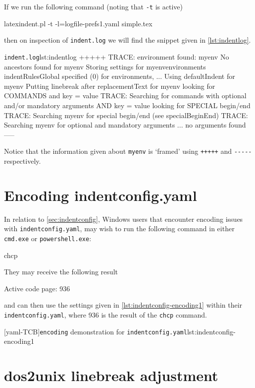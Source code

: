   If we run the following command (noting that \texttt{-t} is active)
  \begin{commandshell}
latexindent.pl -t -l=logfile-prefs1.yaml simple.tex 
\end{commandshell}
  then on inspection of \texttt{indent.log} we will find the snippet given in
  \cref{lst:indentlog}.
  \begin{cmhlistings}[style=tcblatex,morekeywords={TRACE}]{\texttt{indent.log}}{lst:indentlog}
       +++++
TRACE: environment found: myenv
       No ancestors found for myenv
       Storing settings for myenvenvironments
       indentRulesGlobal specified (0) for environments, ...
       Using defaultIndent for myenv
       Putting linebreak after replacementText for myenv
       looking for COMMANDS and key = {value}
TRACE: Searching for commands with optional and/or mandatory arguments AND key = {value}
       looking for SPECIAL begin/end
TRACE: Searching myenv for special begin/end (see specialBeginEnd)
TRACE: Searching myenv for optional and mandatory arguments
       ... no arguments found
       -----
     \end{cmhlistings}
  Notice that the information given about \texttt{myenv} is `framed' using \texttt{+++++}
  and \lstinline!-----! respectively.

 \section{Encoding indentconfig.yaml}\label{app:encoding}
  In relation to \vref{sec:indentconfig}, Windows users that encounter encoding issues with
  \texttt{indentconfig.yaml}, may wish to run the following command in either
  \texttt{cmd.exe} or \texttt{powershell.exe}:
  \begin{dosprompt}
chcp
    \end{dosprompt}
  They may receive the following result
  \begin{dosprompt}
Active code page: 936
    \end{dosprompt}
  and can then use the settings given in \cref{lst:indentconfig-encoding1} within their
  \texttt{indentconfig.yaml}, where 936 is the result of the \texttt{chcp} command.

  [yaml-TCB]{\texttt{encoding} demonstration for \texttt{indentconfig.yaml}}{lst:indentconfig-encoding1}

 \section{dos2unix linebreak adjustment}

